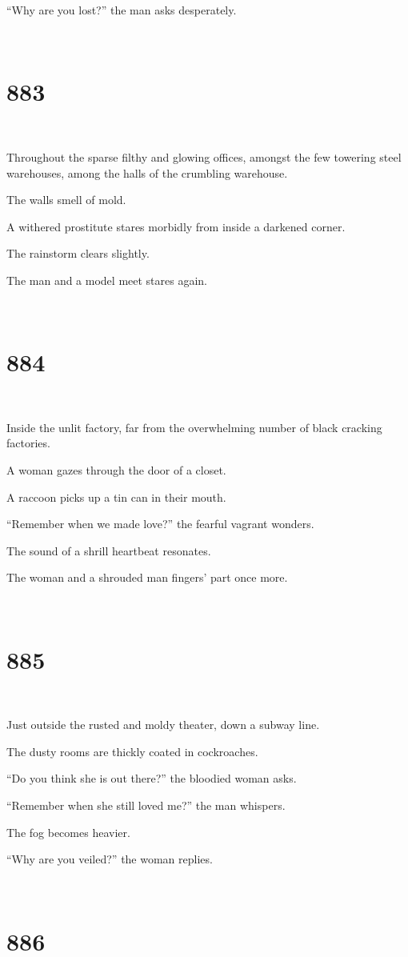 \documentclass{report}
\begin{document}
``Why are you lost?'' the man asks desperately.

~
\chapter*{883}
~

Throughout the sparse filthy and glowing offices, amongst the few towering steel warehouses, among the halls of the crumbling warehouse.

The walls smell of mold.

A withered prostitute stares morbidly from inside a darkened corner.

The rainstorm clears slightly.

The man and a model meet stares again.

~
\chapter*{884}
~

Inside the unlit factory, far from the overwhelming number of black cracking factories.

A woman gazes through the door of a closet.

A raccoon picks up a tin can in their mouth.

``Remember when we made love?'' the fearful vagrant wonders.

The sound of a shrill heartbeat resonates.

The woman and a shrouded man fingers' part once more.

~
\chapter*{885}
~

Just outside the rusted and moldy theater, down a subway line.

The dusty rooms are thickly coated in cockroaches.

``Do you think she is out there?'' the bloodied woman asks.

``Remember when she still loved me?'' the man whispers.

The fog becomes heavier.

``Why are you veiled?'' the woman replies.

~
\chapter*{886}
~
\end{document}
